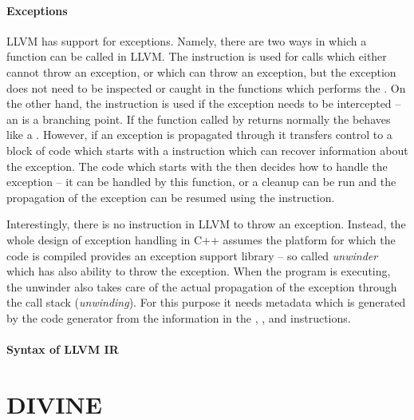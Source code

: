 \paragraph{Exceptions}

LLVM has support for exceptions.
Namely, there are two ways in which a function can be called in LLVM.
The  instruction is used for calls which either cannot throw an
exception, or which can throw an exception, but the exception does not need to
be inspected or caught in the functions which performs the .
On the other hand, the  instruction is used if the exception needs
to be intercepted -- an  is a branching point.
If the function called by  returns normally the  behaves
like a .
However, if an exception is propagated through  it transfers control
to a block of code which starts with a  instruction which can
recover information about the exception.
The code which starts with the  then decides how to handle the
exception -- it can be handled by this function, or a cleanup can be run and
the propagation of the exception can be resumed using the 
instruction.

Interestingly, there is no instruction in LLVM to throw an exception.
Instead, the whole design of exception handling in C++ assumes the platform for
which the code is compiled provides an exception support library -- so called
\emph{unwinder} which has also ability to throw the exception.
When the program is executing, the unwinder also takes care of the actual
propagation of the exception through the call stack (\emph{unwinding}).
For this purpose it needs metadata which is generated by the code generator
from the information in the , , and 
instructions.

\paragraph{Syntax of LLVM IR}


\section{DIVINE}

